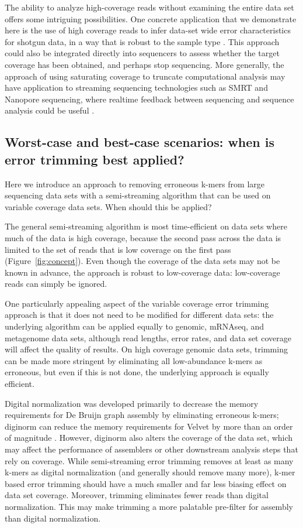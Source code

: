 \documentclass{article}
\begin{document}
The ability to analyze high-coverage reads without examining the
entire data set offers some intriguing possibilities.  One concrete
application that we demonstrate here is the use of high coverage reads
to infer data-set wide error characteristics for shotgun data, in a
way that is robust to the sample type \cite{drisee}.  This approach
could also be integrated directly into sequencers to assess whether
the target coverage has been obtained, and perhaps stop sequencing.
More generally, the approach of using saturating coverage to truncate
computational analysis may have application to streaming sequencing
technologies such as SMRT and Nanopore sequencing, where realtime
feedback between sequencing and sequence analysis could be useful
\cite{pacbio,nanopore}.

\subsection{Worst-case and best-case scenarios: when is error
trimming best applied?}

Here we introduce an approach to removing erroneous k-mers from large
sequencing data sets with a semi-streaming algorithm that can be used
on variable coverage data sets.  When should this be applied?

The general semi-streaming algorithm is most time-efficient on data sets
where much of the data is high coverage, because the second pass
across the data is limited to the set of reads that is low coverage on
the first pass (Figure~\ref{fig:concept}).  Even though the coverage
of the data sets may not be known in advance, the approach is robust
to low-coverage data: low-coverage reads can simply be ignored.

One particularly appealing aspect of the variable coverage error
trimming approach is that it does not need to be modified for
different data sets: the underlying algorithm can be applied equally
to genomic, mRNAseq, and metagenome data sets, although read lengths,
error rates, and data set coverage will affect the quality of results.
On high coverage genomic data sets, trimming can be made more
stringent by eliminating all low-abundance k-mers as erroneous, but
even if this is not done, the underlying approach is equally
efficient.

Digital normalization was developed primarily to decrease the memory
requirements for De Bruijn graph assembly by eliminating erroneous
k-mers; diginorm can reduce the memory requirements for Velvet by more
than an order of magnitude \cite{Brown2012}.  However, diginorm also
alters the coverage of the data set, which may affect the performance
of assemblers or other downstream analysis steps that rely on
coverage.  While semi-streaming error trimming removes at least as many
k-mers as digital normalization (and generally should remove many
more), k-mer based error trimming should have a much smaller and far
less biasing effect on data set coverage.  Moreover, trimming
eliminates fewer reads than digital normalization.  This may
make trimming a more palatable pre-filter for assembly than digital
normalization.
\end{document}
